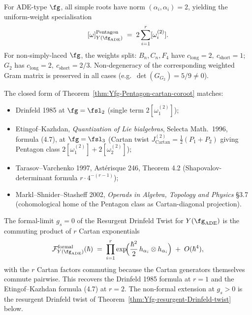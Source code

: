\begin{remark}
\label{rem:Yfg-ADE-specialisation}
For ADE-type $\fg$, all simple roots have norm $(\alpha_i, \alpha_i) = 2$,
yielding the uniform-weight specialisation
\[
 [\omega]^{\mathrm{Pentagon}}_{Y(\fg_{\mathrm{ADE}})}
 \;=\; 2 \sum_{i = 1}^{r} [\omega^{(2)}_i].
\]
For non-simply-laced $\fg$, the weights split: $B_n, C_n, F_4$ have
$c_{\mathrm{long}} = 2,\ c_{\mathrm{short}} = 1$; $G_2$ has
$c_{\mathrm{long}} = 2,\ c_{\mathrm{short}} = 2/3$. Non-degeneracy
of the corresponding weighted Gram matrix is preserved in all
cases (e.g.\ $\det(G_{G_2}) = 5/9 \neq 0$).
\end{remark}

\begin{remark}
\label{rem:Yfg-Pentagon-literature-match}
The closed form of
Theorem~\ref{thm:Yfg-Pentagon-cartan-coroot} matches:
\begin{itemize}
\item Drinfeld 1985 at $\fg = \fsl_2$ (single term
 $2[\omega^{(2)}_1]$);
\item Etingof--Kazhdan, \emph{Quantization of Lie bialgebras}, Selecta
 Math.\ 1996, formula (4.7), at $\fg = \fsl_3$ (Cartan twist
 $J^{(2)}_{\mathrm{Cartan}} = \tfrac{1}{2}(P_1 + P_2)$ giving
 Pentagon class $2[\omega^{(2)}_1] + 2[\omega^{(2)}_2]$);
\item Tarasov--Varchenko 1997, Astérisque 246, Theorem 4.2
 (Shapovalov-determinant formula $r \cdot 4^{-(r - 1)}$);
\item Markl--Shnider--Stasheff 2002, \emph{Operads in Algebra,
 Topology and Physics} \S3.7 (cohomological home of the
 Pentagon class as Cartan-diagonal projection).
\end{itemize}
\end{remark}

\begin{remark}
\label{rem:Yfg-RDT-cartan-product}
The formal-limit $g_s = 0$ of the Resurgent Drinfeld Twist for
$Y(\fg_{\mathrm{ADE}})$ is the commuting product of $r$ Cartan
exponentials
\[
 \mathcal{F}^{\mathrm{formal}}_{Y(\fg_{\mathrm{ADE}})}(\hbar)
 \;=\; \prod_{i = 1}^{r} \exp\!\Bigl(\frac{\hbar^2}{2}\,
 h_{\alpha_i} \otimes h_{\alpha_i}\Bigr)
 \;+\; O(\hbar^4),
\]
with the $r$ Cartan factors commuting because the Cartan generators
themselves commute pairwise. This recovers the Drinfeld 1985 formula
at $r = 1$ and the Etingof--Kazhdan formula (4.7) at $r = 2$. The
non-formal extension at $g_s > 0$ is the resurgent Drinfeld twist
of Theorem~\ref{thm:Yfg-resurgent-Drinfeld-twist} below.
\end{remark}


